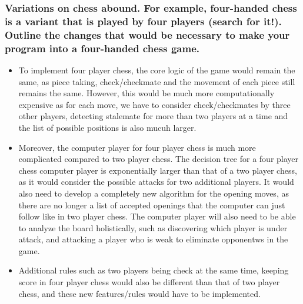 \documentclass{article}
\begin{document}
\subsubsection*{Variations on chess abound. For example, four-handed chess is a variant that is played by four players (search for it!). Outline the changes that would be necessary to make your program into a four-handed chess game.}
\begin{itemize}
    \item To implement four player chess, the core logic of the game would remain the same, as piece taking, check/checkmate and the movement of each piece still remains the same.
    However, this would be much more computationally expensive as for each move, we have to consider check/checkmates by three other players, detecting stalemate for more than two players at a time and the list of 
    possible positions is also mucuh larger.
    \item Moreover, the computer player for four player chess is much more complicated compared to two player chess. The decision tree for a four player chess computer player is exponentially larger 
    than that of a two player chess, as it would consider the possible attacks for two additional players. It would also need to develop a completely new algorithm for the opening moves, as there are no longer 
    a list of accepted openings that the computer can just follow like in two player chess. The computer player will also need to be able to analyze the board holistically, such as discovering 
    which player is under attack, and attacking a player who is weak to eliminate opponentws in the game.
    \item Additional rules such as two players being check at the same time, keeping score in four player chess would also be different than that of two player chess,
    and these new features/rules would have to be implemented.
\end{itemize}
\end{document}
